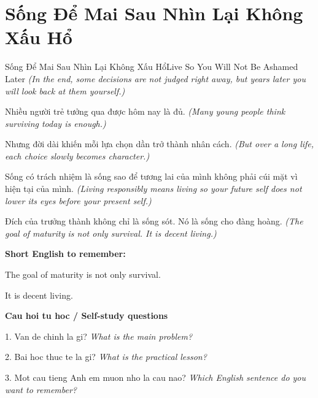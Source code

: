 \section{Sống Để Mai Sau Nhìn Lại Không Xấu Hổ}
\begin{truyen}{Sống Để Mai Sau Nhìn Lại Không Xấu Hổ}{Live So You Will Not Be Ashamed Later}
\textit{(In the end, some decisions are not judged right away, but years later you will look back at them yourself.)}

Nhiều người trẻ tưởng qua được hôm nay là đủ.
\textit{(Many young people think surviving today is enough.)}

Nhưng đời dài khiến mỗi lựa chọn dần trở thành nhân cách.
\textit{(But over a long life, each choice slowly becomes character.)}

Sống có trách nhiệm là sống sao để tương lai của mình không phải cúi mặt vì hiện tại của mình.
\textit{(Living responsibly means living so your future self does not lower its eyes before your present self.)}

\end{truyen}

\begin{baihoc}
Đích của trưởng thành không chỉ là sống sót. Nó là sống cho đàng hoàng.
\textit{(The goal of maturity is not only survival. It is decent living.)}
\end{baihoc}

\begin{ghinhoanh}
\textbf{Short English to remember:}

The goal of maturity is not only survival.

It is decent living.

\end{ghinhoanh}

\begin{tuhocnhanh}
\textbf{Cau hoi tu hoc / Self-study questions}

1. Van de chinh la gi? \textit{What is the main problem?}

2. Bai hoc thuc te la gi? \textit{What is the practical lesson?}

3. Mot cau tieng Anh em muon nho la cau nao? \textit{Which English sentence do you want to remember?}
\end{tuhocnhanh}
